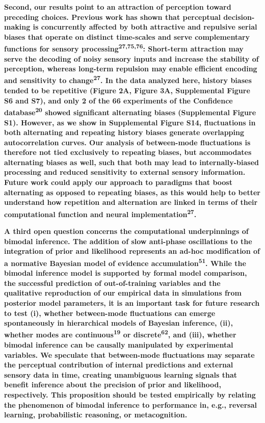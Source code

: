 \documentclass[
]{article}
\begin{document}
\textbf{Second, our results point to an attraction of perception toward
preceding choices. Previous work has shown that perceptual
decision-making is concurrently affected by both attractive and
repulsive serial biases that operate on distinct time-scales and serve
complementary functions for sensory
processing\textsuperscript{27,75,76}: Short-term attraction may serve
the decoding of noisy sensory inputs and increase the stability of
perception, whereas long-term repulsion may enable efficient encoding
and sensitivity to change\textsuperscript{27}. In the data analyzed
here, history biases tended to be repetitive (Figure 2A, Figure 3A,
Supplemental Figure S6 and S7), and only 2 of the 66 experiments of the
Confidence database\textsuperscript{20} showed significant alternating
biases (Supplemental Figure S1). However, as we show in Supplemental
Figure S14, fluctuations in both alternating and repeating history
biases generate overlapping autocorrelation curves. Our analysis of
between-mode fluctuations is therefore not tied exclusively to repeating
biases, but accommodates alternating biases as well, such that both may
lead to internally-biased processing and reduced sensitivity to external
sensory information. Future work could apply our approach to paradigms
that boost alternating as opposed to repeating biases, as this would
help to better understand how repetition and alternation are linked in
terms of their computational function and neural
implementation\textsuperscript{27}.}

\textbf{A third open question concerns the computational underpinnings
of bimodal inference. The addition of slow anti-phase oscillations to
the integration of prior and likelihood represents an ad-hoc
modification of a normative Bayesian model of evidence
accumulation\textsuperscript{51}. While the bimodal inference model is
supported by formal model comparison, the successful prediction of
out-of-training variables and the qualitative reproduction of our
empirical data in simulations from posterior model parameters, it is an
important task for future research to test (i), whether between-mode
fluctuations can emerge spontaneously in hierarchical models of Bayesian
inference, (ii), whether modes are continuous\textsuperscript{19} or
discrete\textsuperscript{62}, and (iii), whether bimodal inference can
be causally manipulated by experimental variables. We speculate that
between-mode fluctuations may separate the perceptual contribution of
internal predictions and external sensory data in time, creating
unambiguous learning signals that benefit inference about the precision
of prior and likelihood, respectively. This proposition should be tested
empirically by relating the phenomenon of bimodal inference to
performance in, e.g., reversal learning, probabilistic reasoning, or
metacognition.}
\end{document}
